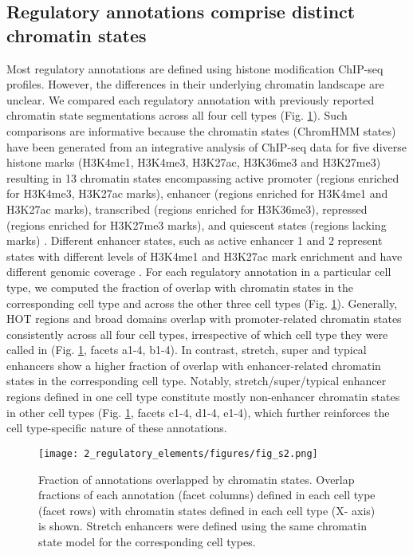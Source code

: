 \subsection{Regulatory annotations comprise distinct chromatin states}
Most regulatory annotations are defined using histone modification ChIP-seq profiles. However, the differences in their underlying chromatin landscape are unclear. We compared each regulatory annotation with previously reported chromatin state segmentations across all four cell types \cite{varshneyGeneticRegulatorySignatures2017} (Fig. \ref{fig:c1_fs2}). Such comparisons are informative because the chromatin states (ChromHMM states) have been generated from an integrative analysis of ChIP-seq data for five diverse histone marks (H3K4me1, H3K4me3, H3K27ac, H3K36me3 and H3K27me3) resulting in 13 chromatin states encompassing active promoter (regions enriched for H3K4me3, H3K27ac marks), enhancer (regions enriched for H3K4me1 and H3K27ac marks), transcribed (regions enriched for H3K36me3), repressed (regions enriched for H3K27me3 marks), and quiescent states (regions lacking marks) \cite{varshneyGeneticRegulatorySignatures2017}. Different enhancer states, such as active enhancer 1 and 2 represent states with different levels of H3K4me1 and H3K27ac mark enrichment and have different genomic coverage \cite{varshneyGeneticRegulatorySignatures2017}. For each regulatory annotation in a particular cell type, we computed the fraction of overlap with chromatin states in the corresponding cell type and across the other three cell types (Fig. \ref{fig:c1_fs2}). Generally, HOT regions and broad domains overlap with promoter-related chromatin states consistently across all four cell types, irrespective of which cell type they were called in (Fig. \ref{fig:c1_fs2}, facets a1-4, b1-4). In contrast, stretch, super and typical enhancers show a higher fraction of overlap with enhancer-related chromatin states in the corresponding cell type. Notably, stretch/super/typical enhancer regions defined in one cell type constitute mostly non-enhancer chromatin states in other cell types (Fig. \ref{fig:c1_fs2}, facets c1-4, d1-4, e1-4), which further reinforces the cell type-specific nature of these annotations. \\

\begin{figure}
    \centering
    \texttt{[image: 2\_regulatory\_elements/figures/fig\_s2.png]}
    \caption{Fraction of annotations overlapped by chromatin states. Overlap fractions of each annotation (facet columns) defined in each cell type (facet rows) with chromatin states defined in each cell type (X- axis) is shown. Stretch enhancers were defined using the same chromatin state model for the corresponding cell types.}
    \label{fig:c1_fs2}
\end{figure}

